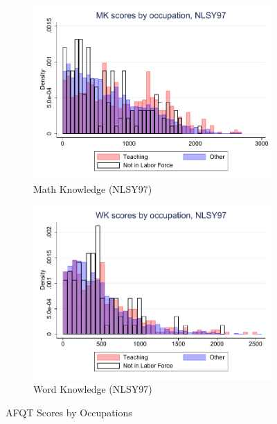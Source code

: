 \documentclass[onehalfspacing,11pt]{article}
\begin{document}
\begin{figure}
\begin{subfigure}{0.49\textwidth}
		\includegraphics[width=\linewidth]{NLSY97_MK_occ.pdf}
		\caption{Math Knowledge (NLSY97)} \label{fig:nlsy97math}
	\end{subfigure}
	\hspace*{\fill} %
	\begin{subfigure}{0.49\textwidth}
		\includegraphics[width=\linewidth]{NLSY97_WK_occ.pdf}
		\caption{Word Knowledge (NLSY97)} \label{fig:nlsy97wprd}
	\end{subfigure}

	\caption{AFQT Scores by Occupations}
	\label{fig:nlsy_by_occ}
\end{figure}

\end{document}

